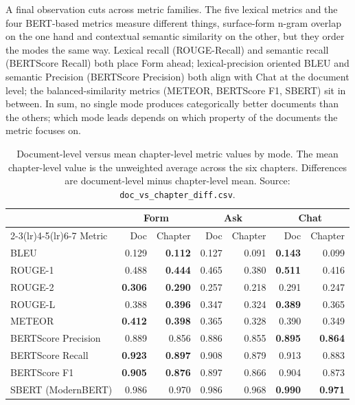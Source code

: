 \sloppy
A final observation cuts across metric families. The five lexical
metrics and the four BERT-based metrics measure different things,
surface-form n-gram overlap on the one hand and contextual
semantic similarity on the other, but they order the modes the
same way. Lexical recall (ROUGE-Recall) and semantic recall
(BERTScore Recall) both place Form ahead; lexical-precision
oriented BLEU and semantic Precision (BERTScore Precision) both
align with Chat at the document level; the balanced-similarity
metrics (METEOR, BERTScore F1, SBERT) sit in between. In sum,
no single mode produces categorically better documents than the
others; which mode leads depends on which property of the
documents the metric focuses on.
\fussy

\begin{table}[htbp]
\centering
\small
\begin{tabular}{@{}l r r r r r r@{}}
\toprule
& \multicolumn{2}{c}{Form} & \multicolumn{2}{c}{Ask} & \multicolumn{2}{c}{Chat} \\
\cmidrule(lr){2-3}\cmidrule(lr){4-5}\cmidrule(lr){6-7}
Metric & Doc & Chapter & Doc & Chapter & Doc & Chapter \\
\midrule
BLEU                & 0.129 & \textbf{0.112} & 0.127 & 0.091 & \textbf{0.143} & 0.099 \\
ROUGE-1             & 0.488 & \textbf{0.444} & 0.465 & 0.380 & \textbf{0.511} & 0.416 \\
ROUGE-2             & \textbf{0.306} & \textbf{0.290} & 0.257 & 0.218 & 0.291 & 0.247 \\
ROUGE-L             & 0.388 & \textbf{0.396} & 0.347 & 0.324 & \textbf{0.389} & 0.365 \\
METEOR              & \textbf{0.412} & \textbf{0.398} & 0.365 & 0.328 & 0.390 & 0.349 \\
BERTScore Precision & 0.889 & 0.856 & 0.886 & 0.855 & \textbf{0.895} & \textbf{0.864} \\
BERTScore Recall    & \textbf{0.923} & \textbf{0.897} & 0.908 & 0.879 & 0.913 & 0.883 \\
BERTScore F1        & \textbf{0.905} & \textbf{0.876} & 0.897 & 0.866 & 0.904 & 0.873 \\
SBERT (ModernBERT)  & 0.986 & 0.970 & 0.986 & 0.968 & \textbf{0.990} & \textbf{0.971} \\
\bottomrule
\end{tabular}
\caption{Document-level versus mean chapter-level metric values by
mode. The mean chapter-level value is the unweighted average across
the six chapters. Differences are document-level minus chapter-level
mean. Source: \texttt{doc\_vs\_chapter\_diff.csv}.}
\label{tab:doc-vs-chapter}
\end{table}
